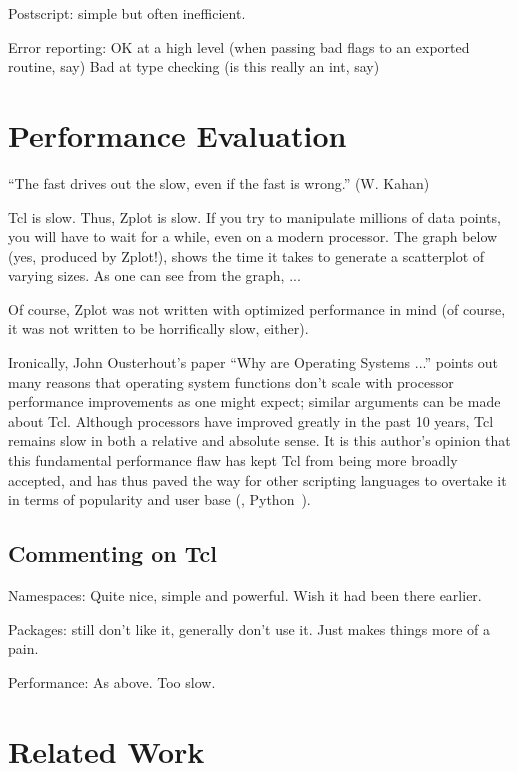 Postscript: simple but often inefficient.



Error reporting: 
OK at a high level
(when passing bad flags to an exported routine, say)
Bad at type checking (is this really an int, say)






\section{Performance Evaluation}

``The fast drives out the slow, even if the fast is wrong.'' (W. Kahan)

Tcl is slow. Thus, Zplot is slow. If you try to manipulate millions of data
points, you will have to wait for a while, even on a modern processor. The
graph below (yes, produced by Zplot!), shows the time it takes to generate a
scatterplot of varying sizes. As one can see from the graph, ...

Of course, Zplot was not written with optimized performance in mind (of
course, it was not written to be horrifically slow, either). 

Ironically, John Ousterhout's paper ``Why are Operating Systems ...''  points
out many reasons that operating system functions don't scale with processor
performance improvements as one might expect; similar arguments can be made
about Tcl. Although processors have improved greatly in the past 10 years, Tcl
remains slow in both a relative and absolute sense. It is this author's
opinion that this fundamental performance flaw has kept Tcl from being more
broadly accepted, and has thus paved the way for other scripting languages to
overtake it in terms of popularity and user base (\eg, Python~\cite{Python}).

\subsection{Commenting on Tcl}



Namespaces:
Quite nice, simple and powerful.
Wish it had been there earlier.

Packages:
still don't like it, generally don't use it.
Just makes things more of a pain.

Performance:
As above. Too slow.


\section{Related Work}

